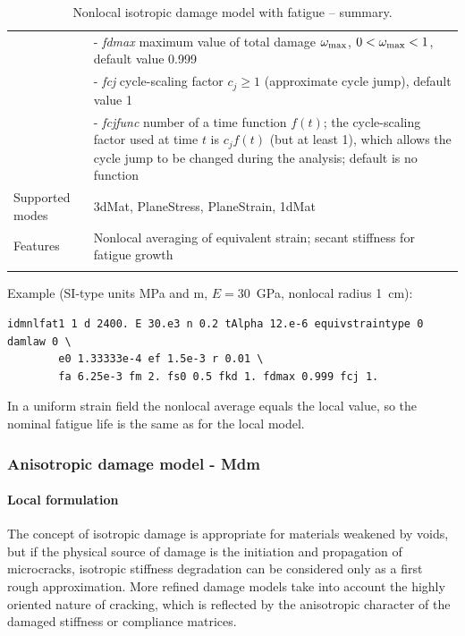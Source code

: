 \documentclass[a4paper]{article}
\newcommand{\param}[1]{{\it #1}}
\begin{document}
\begin{longtable}{|l|p{9cm}|}
&- \param{fdmax} maximum value of total damage $\omega_{\rm max}$, $0<\omega_{\rm max}<1$, default value 0.999\\
&- \param{fcj} cycle-scaling factor $c_j\ge 1$ (approximate cycle jump), default value 1\\
&- \param{fcjfunc} number of a time function $f(t)$; the cycle-scaling factor used at time $t$ is $c_jf(t)$ (but at least 1), which allows the cycle jump to be changed during the analysis; default is no function\\
Supported modes& 3dMat, PlaneStress, PlaneStrain, 1dMat\\
Features & Nonlocal averaging of equivalent strain; secant stiffness for fatigue growth\\
\hline
\caption{Nonlocal isotropic damage model with fatigue -- summary.}
\label{idnlfat_table}
\end{longtable}

\noindent Example (SI-type units MPa and m, $E=30$~GPa, nonlocal radius 1~cm):
\begin{verbatim}
idmnlfat1 1 d 2400. E 30.e3 n 0.2 tAlpha 12.e-6 equivstraintype 0 damlaw 0 \
        e0 1.33333e-4 ef 1.5e-3 r 0.01 \
        fa 6.25e-3 fm 2. fs0 0.5 fkd 1. fdmax 0.999 fcj 1.
\end{verbatim}
In a uniform strain field the nonlocal average equals the local value, so the nominal fatigue life is the same as for the local model.

\clearpage

\subsubsection{Anisotropic damage model - Mdm}

\paragraph{Local formulation}

The concept of isotropic damage is appropriate for materials weakened
by voids, but if the physical source of damage is the initiation and
propagation of microcracks, isotropic stiffness degradation
can be considered only as a first rough
approximation. More refined damage models take into account the highly
oriented nature of cracking, which is reflected by the anisotropic
character of the damaged stiffness or compliance matrices.
\end{document}
